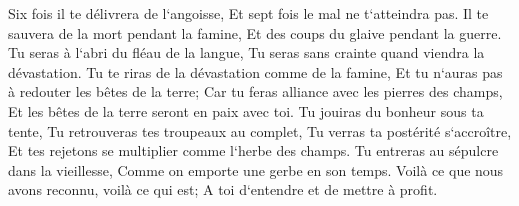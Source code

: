 \verse Six fois il te délivrera de l`angoisse, Et sept fois le mal ne t`atteindra pas. 
\verse Il te sauvera de la mort pendant la famine, Et des coups du glaive pendant la guerre. 
\verse Tu seras à l`abri du fléau de la langue, Tu seras sans crainte quand viendra la dévastation. 
\verse Tu te riras de la dévastation comme de la famine, Et tu n`auras pas à redouter les bêtes de la terre; 
\verse Car tu feras alliance avec les pierres des champs, Et les bêtes de la terre seront en paix avec toi. 
\verse Tu jouiras du bonheur sous ta tente, Tu retrouveras tes troupeaux au complet, 
\verse Tu verras ta postérité s`accroître, Et tes rejetons se multiplier comme l`herbe des champs. 
\verse Tu entreras au sépulcre dans la vieillesse, Comme on emporte une gerbe en son temps. 
\verse Voilà ce que nous avons reconnu, voilà ce qui est; A toi d`entendre et de mettre à profit. 

